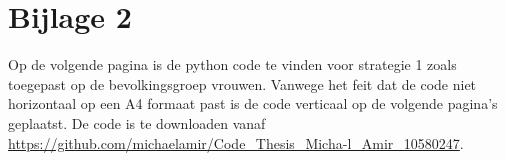 \newpage
\section{Bijlage 2}
\label{b2}

Op de volgende pagina is de python code te vinden voor strategie 1 zoals toegepast op de bevolkingsgroep vrouwen. Vanwege het feit dat de code niet horizontaal op een A4 formaat past is de code verticaal op de volgende pagina's geplaatst. De code is te downloaden vanaf \url{https://github.com/michaelamir/Code_Thesis_Micha-l_Amir_10580247}. 


\newpage